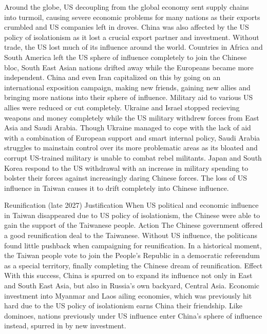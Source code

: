             Around the globe, US decoupling from the global economy sent supply chains into turmoil, causing severe economic problems for many nations as their exports crumbled and US companies left in droves. China was also affected by the US policy of isolationism as it lost a crucial export partner and investment. 
            Without trade, the US lost much of its influence around the world. Countries in Africa and South America left the US sphere of influence completely to join the Chinese bloc, South East Asian nations drifted away while the Europeans became more independent. China and even Iran capitalized on this by going on an international exposition campaign, making new friends, gaining new allies and bringing more nations into their sphere of influence.
            Military aid to various US allies were reduced or cut completely. Ukraine and Israel stopped recieving weapons and money completely while the US military withdrew forces from East Asia and Saudi Arabia.
            Though Ukraine managed to cope with the lack of aid with a combination of European support and smart internal policy, Saudi Arabia struggles to mainstain control over its more problematic areas as its bloated and corrupt US-trained military is unable to combat rebel militants.
            Japan and South Korea respond to the US withdrawal with an increase in military spending to bolster their forces against increasingly daring Chinese forces. The loss of US influence in Taiwan causes it to drift completely into Chinese influence.

    Reunification (late 2027)
        Justification
            When US political and economic influence in Taiwan disappeared due to US policy of isolationism, the Chinese were able to gain the support of the Taiwanese people.
        Action
            The Chinese government offered a good reunification deal to the Taiwanese. Without US influence, the politicans found little pushback when campaigning for reunification.
            In a historical moment, the Taiwan people vote to join the People's Republic in a democratic referendum as a special territory, finally completing the Chinese dream of reunification.
        Effect
            With this success, China is spurred on to expand its influence not only in East and South East Asia, but also in Russia's own backyard, Central Asia.
            Economic investment into Myanmar and Laos ailing economies, which was previously hit hard due to the US policy of isolationism earns China their friendship.
            Like dominoes, nations previously under US influence enter China's sphere of influence instead, spurred in by new investment. 

